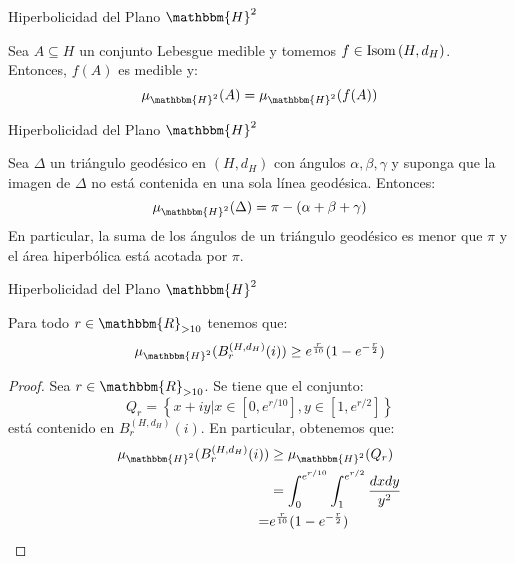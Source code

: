 \documentclass[xcolor=dvipsnames]{beamer}
\theoremstyle{largebreak}
\newcommand{\bbm}[1]{\ensuremath{\mathbbm{#1}}}
\newcommand{\Isom}[1]{\ensuremath{\textup{Isom}\left(#1\right)}}
\begin{document}
\begin{frame}{Hiperbolicidad del Plano $\bbm{H}^2$}
    \begin{propo}
        Sea $A\subseteq H$ un conjunto Lebesgue medible y tomemos $f\in\Isom{H,d_H}$. Entonces, $f(A)$ es medible y:
        \begin{equation*}
            \mu_{\bbm{H}^2}(A)=\mu_{\bbm{H}^2}(f(A))
        \end{equation*}
    \end{propo}
\end{frame}

\begin{frame}{Hiperbolicidad del Plano $\bbm{H}^2$}
    \begin{theor}
        Sea $\Delta$ un triángulo geodésico en $(H,d_H)$ con ángulos $\alpha,\beta,\gamma$ y suponga que la imagen de $\Delta$ no está contenida en una sola línea geodésica. Entonces:
        \begin{equation*}
            \mu_{\bbm{H}^2}(\Delta)=\pi-(\alpha+\beta+\gamma)
        \end{equation*}
        En particular, la suma de los ángulos de un triángulo geodésico es menor que $\pi$ y el área hiperbólica está acotada por $\pi$.
    \end{theor}
\end{frame}

\begin{frame}{Hiperbolicidad del Plano $\bbm{H}^2$}
    \begin{propo}
        Para todo $r\in\bbm{R}_{>10}$ tenemos que:
        \begin{equation*}
            \mu_{\bbm{H}^2}(B_r^{(H,d_H)}(i))\geq e^{\frac{r}{10}}(1-e^{-\frac{r}{2}})
        \end{equation*}
    \end{propo}
    \begin{proof}
        Sea $r\in\bbm{R}_{>10}$. Se tiene que el conjunto:
        \begin{equation*}
            Q_r=\left\{x+iy\Big|x\in[0,e^{ r/10}],y\in[1,e^{r/2}] \right\}
        \end{equation*}
        está contenido en $B_r^{(H,d_H)}(i)$. En particular, obtenemos que:
        \begin{equation*}
            \begin{split}
                \mu_{\bbm{H}^2}(B_r^{(H,d_H)}(i))&\geq\mu_{\bbm{H}^2}(Q_r)\\
                &=\int_{0}^{e^{r/10}}\int_{1}^{e^{r/2}}\frac{dxdy}{y^2}\\
                =&e^{\frac{r}{10}}(1-e^{-\frac{r}{2}})\\
            \end{split}
        \end{equation*}
    \end{proof}
\end{frame}
\end{document}
